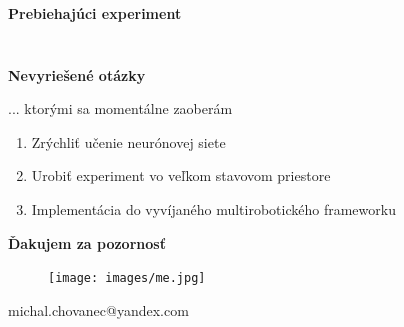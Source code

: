 \documentclass[xcolor=dvipsnames]{beamer}
\begin{document}
\begin{frame}[fragile]{\bf Prebiehajúci experiment}
\begin{columns}
\begin{column}{0.8\textwidth}
\begin{figure}[ht]
            \end{figure}

    	\end{column}
    \end{columns}

\end{frame}


\begin{frame}[fragile]{\bf Nevyriešené otázky}

    ... ktorými sa momentálne zaoberám

	\begin{enumerate}
	\item{Zrýchliť učenie neurónovej siete}
	\item{Urobiť experiment vo veľkom stavovom priestore}
    \item{Implementácia do vyvíjaného multirobotického frameworku}
	\end{enumerate}

\end{frame}


\begin{frame}{\bf Ďakujem za pozornosť}

\begin{figure}[ht]
\begin{center}
\begin{minipage}{0.8\linewidth}
\begin{center}
  \texttt{[image: images/me.jpg]}
\end{center}
\end{minipage}
\end{center}
\end{figure}


\centerline{michal.chovanec@yandex.com}

\end{frame}
\end{document}
